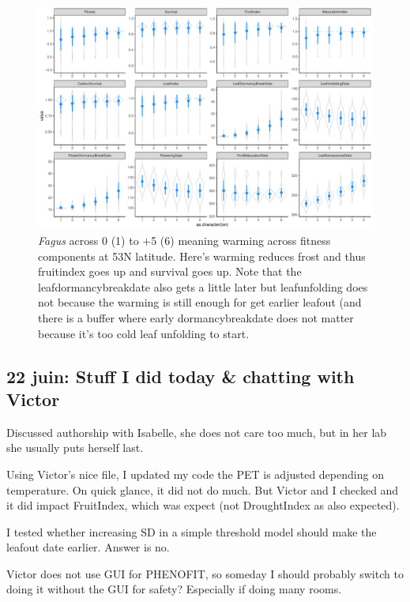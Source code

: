 \documentclass[11pt,letter]{article}
\begin{document}
\begin{figure} 
 \begin{center}
\noindent \includegraphics[width=1\textwidth]{..//analyses/graphs/phenofit/sims/meansim53_allmetricsFS.pdf}
  \caption{\emph{Fagus} across 0 (1) to $+$5 (6) meaning warming across fitness components at 53\degree N latitude. Here's warming reduces frost and thus fruitindex goes up and survival goes up. Note that the leafdormancybreakdate also gets a little later but leafunfolding does not because the warming is still enough for get earlier leafout (and there is a buffer where early dormancybreakdate does not matter because it's too cold leaf unfolding to start. }
  \label{fig:fagusmean53}
  \end{center}
\end{figure}

\subsection{22 juin: Stuff I did today \& chatting with Victor}

Discussed authorship with Isabelle, she does not care too much, but in her lab she usually puts herself last. 

Using Victor's nice file, I updated my code the PET is adjusted depending on temperature. On quick glance, it did not do much. But Victor and I checked and it did impact FruitIndex, which was expect (not DroughtIndex as also expected). 

I tested whether increasing SD in a simple threshold model should make the leafout date earlier. Answer is no. 

Victor does not use GUI for PHENOFIT, so someday I should probably switch to doing it without the GUI for safety? Especially if doing many rooms. 
\end{document}
